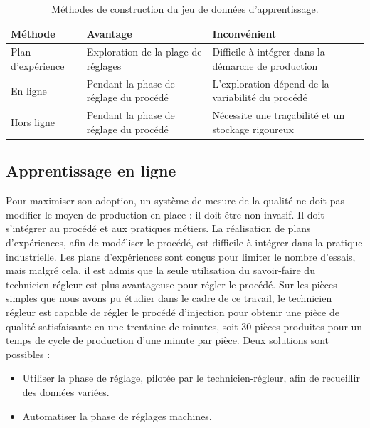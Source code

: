 \begin{table}[ht]
	\hspace*{-8mm}
	\begin{tabular}{|l|l|l|}
		\arrayrulecolor{black}
		\hline
		Méthode           & Avantage                                           & Inconvénient                                        \\ \hline
		\hline
		Plan d’expérience & Exploration de la plage de réglages  & Difficile à intégrer dans la démarche de production \\ \hline
		En ligne          & Pendant la phase de réglage du procédé & L’exploration dépend de la variabilité du procédé    \\ \hline
		Hors ligne        & Pendant la phase de réglage du procédé & Nécessite une traçabilité et un stockage rigoureux \\ \hline
	\end{tabular}
	\caption{Méthodes de construction du jeu de données d'apprentissage.}
	\label{tab:dataset}
\end{table}

\subsection{Apprentissage en ligne}
Pour maximiser son adoption, un système de mesure de la qualité ne doit pas modifier le moyen de production en place : il doit être non invasif.
Il doit s'intégrer au procédé et aux pratiques métiers. La réalisation de plans d'expériences, afin de modéliser le procédé, est difficile à intégrer dans la pratique industrielle.
Les plans d'expériences sont conçus pour limiter le nombre d'essais, mais malgré cela, il est admis que la seule utilisation du savoir-faire du technicien-régleur est plus avantageuse pour régler le procédé.
Sur les pièces simples que nous avons pu étudier dans le cadre de ce travail, le technicien régleur est capable de régler le procédé d'injection pour obtenir une pièce de qualité satisfaisante en une trentaine de minutes, soit 30 pièces produites pour un temps de cycle de production d'une minute par pièce.
Deux solutions sont possibles :
\begin{itemize}
	\item Utiliser la phase de réglage, pilotée par le technicien-régleur, afin de recueillir des données variées.
	\item Automatiser la phase de réglages machines.
\end{itemize}

